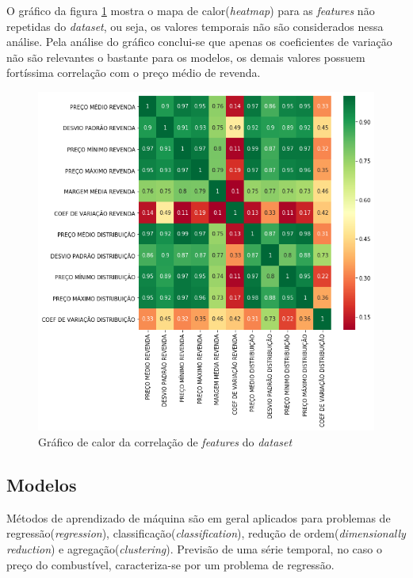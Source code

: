 O gráfico da figura \ref{heatmap} mostra o mapa de calor(\textit{heatmap}) para as \textit{features} não repetidas do \textit{dataset}, ou seja, os valores temporais não são considerados nessa análise. Pela análise do gráfico conclui-se que apenas os coeficientes de variação não são relevantes o bastante para os modelos, os demais valores possuem fortíssima correlação com o preço médio de revenda.

\begin{figure}[!ht]
\centering
\caption{Gráfico de calor da correlação de \textit{features} do \textit{dataset}}
\label{heatmap}
\includegraphics[width=1 \textwidth]{Figuras/heatmap.png}
\end{figure}

\subsection{Modelos}

Métodos de aprendizado de máquina são em geral aplicados para problemas de regressão(\textit{regression}), classificação(\textit{classification}), redução de ordem(\textit{dimensionally reduction}) e agregação(\textit{clustering}). Previsão de uma série temporal, no caso o preço do combustível, caracteriza-se por um problema de regressão\cite{Eletricity}.

